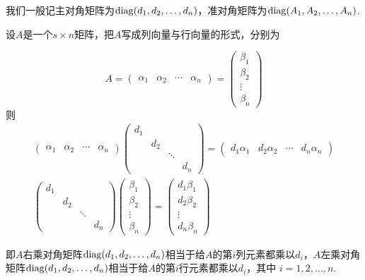 我们一般记主对角矩阵为$\operatorname{diag}(d_1,d_2,\dots,d_n)$，准对角矩阵为$\operatorname{diag}(A_1,A_2,\dots,A_n)$.
\begin{theorem}
    设$A$是一个$s \times n$矩阵，把$A$写成列向量与行向量的形式，分别为

    \[ A = \begin{pmatrix}\alpha_1 & \alpha_2 & \cdots & \alpha_n\end{pmatrix} = \begin{pmatrix} \beta_1 \\ \beta_2 \\ \vdots \\ \beta_n \end{pmatrix} \]
    则
    \begin{gather*}
        \begin{pmatrix}\alpha_1 & \alpha_2 & \cdots & \alpha_n\end{pmatrix}
        \begin{pmatrix}
            d_1 &     &        &     \\
                & d_2 &        &     \\
                &     & \ddots &     \\
                &     &        & d_n
        \end{pmatrix} = \begin{pmatrix}d_1\alpha_1 & d_2\alpha_2 & \cdots & d_n\alpha_n\end{pmatrix} \\
        \begin{pmatrix}
            d_1 &     &        &     \\
                & d_2 &        &     \\
                &     & \ddots &     \\
                &     &        & d_n
        \end{pmatrix} \begin{pmatrix} \beta_1 \\ \beta_2 \\ \vdots \\ \beta_n \end{pmatrix} = \begin{pmatrix} d_1\beta_1 \\ d_2\beta_2 \\ \vdots \\ d_n\beta_n \end{pmatrix}
    \end{gather*}

    即$A$右乘对角矩阵$\operatorname{diag}(d_1,d_2,\ldots,d_n)$相当于给$A$的第$i$列元素都乘以$d_i$，$A$左乘对角矩阵$\operatorname{diag}(d_1,d_2,\ldots,d_n)$相当于给$A$的第$i$行元素都乘以$d_i$，其中 $i=1,2,\ldots,n$.
\end{theorem}

